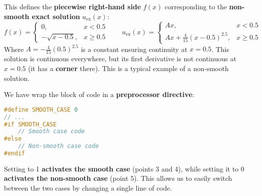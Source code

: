 This defines the \textbf{piecewise right-hand side} $f(x)$ corresponding to the \textbf{non-smooth exact solution} $u_{\text{ex}}(x)$:
\begin{equation*}
    f(x) = \begin{cases}
        0, & x < 0.5 \\
        -\sqrt{x - 0.5}, & x \geq 0.5
    \end{cases}
    \quad\quad
    u_{\text{ex}}(x) = \begin{cases}
        A x, & x < 0.5 \\
        A x + \frac{4}{15} (x - 0.5)^{2.5}, & x \geq 0.5
    \end{cases}
\end{equation*}
Where $A = -\frac{4}{15} (0.5)^{2.5}$ is a constant ensuring continuity at $x = 0.5$. This solution is continuous everywhere, but its first derivative is not continuous at $x = 0.5$ (it has a \textbf{corner} there). This is a typical example of a non-smooth solution.

\highspace
We have wrap the block of code in a \textbf{preprocessor directive}:
\begin{lstlisting}[language=C++]
#define SMOOTH_CASE 0
// ...
#if SMOOTH_CASE
    // Smooth case code
#else
    // Non-smooth case code
#endif\end{lstlisting}
Setting  to 1 \textbf{activates the smooth case} (points 3 and 4), while setting it to 0 \textbf{activates the non-smooth case} (point 5). This allows us to easily switch between the two cases by changing a single line of code.

